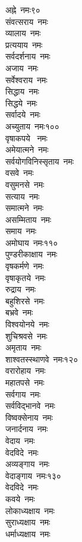 \begin{multicols}{2}
\begin{flushleft}
अह्ने~नमः\hfill ९०\\
संवत्सराय~नमः\\
व्यालाय~नमः\\
प्रत्ययाय~नमः\\
सर्वदर्शनाय~नमः\\
अजाय~नमः\\
सर्वेश्वराय~नमः\\
सिद्धाय~नमः\\
सिद्धये~नमः\\
सर्वादये~नमः\\
अच्युताय~नमः\hfill १००\\
वृषाकपये ~नमः\\
अमेयात्मने~नमः\\
सर्वयोगविनिस्सृताय~नमः\\
वसवे~नमः\\
वसुमनसे~नमः\\
सत्याय~नमः\\
समात्मने~नमः\\
असम्मिताय~नमः\\
समाय~नमः\\
अमोघाय~नमः\hfill ११०\\
पुण्डरीकाक्षाय~नमः\\
वृषकर्मणे~नमः\\
वृषाकृतये~नमः\\
रुद्राय~नमः\\
बहुशिरसे~नमः\\
बभ्रवे~नमः\\
विश्वयोनये~नमः\\
शुचिश्रवसे~नमः\\
अमृताय~नमः\\
शाश्वतस्स्थाणवे~नमः\hfill १२०\\
वरारोहाय~नमः\\
महातपसे~नमः\\
सर्वगाय~नमः\\
सर्वविद्भानवे~नमः\\
विष्वक्सेनाय~नमः\\
जनार्दनाय~नमः\\
वेदाय~नमः\\
वेदविदे~नमः\\
अव्यङ्गाय~नमः\\
वेदाङ्गाय~नमः\hfill १३०\\
वेदविदे~नमः\\
कवये~नमः\\
लोकाध्यक्षाय~नमः\\
सुराध्यक्षाय~नमः\\
धर्माध्यक्षाय~नमः\\

\end{flushleft}
\end{multicols}
